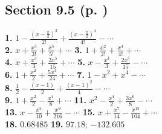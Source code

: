 \begin{multicols*}{2}
\subsection*{Section 9.5 (p. \pageref{sec9dot5})}
\textbf{1.} $1 - \frac{(x-\frac{\pi}{2})^2}{2!} + \frac{(x-\frac{\pi}{2})^4}{4!} - \cdots$\\
\textbf{2.} $x + \frac{x^3}{3!} + \frac{x^5}{5!} + \cdots$ \quad
\textbf{3.} $1 + \frac{x^2}{2!} + \frac{x^4}{4!} + \cdots$\\
\textbf{4.} $x + \frac{x^3}{3} + \frac{2x^5}{15} + \cdots$ \quad
\textbf{5.} $x - \frac{x^3}{3} + \frac{2x^5}{15} - \cdots$\\
\textbf{6.} $1 + \frac{x^2}{2} + \frac{5x^4}{24} + \cdots$ \quad
\textbf{7.} $1 - x^2 + x^4 - \cdots$\\
\textbf{8.} $\frac{1}{2} - \frac{(x-1)}{2} + \frac{(x-1)^2}{4} - \cdots$\\
\textbf{9.} $1 + \frac{x^2}{2} - \frac{x^4}{8} + \cdots$ \quad
\textbf{11.} $x^2 - \frac{x^4}{2} + \frac{3x^6}{8} - \cdots$\\
\textbf{13.} $x - \frac{x^5}{10} + \frac{x^9}{216} - \cdots$ \quad
\textbf{15.} $x + \frac{x^7}{14} - \frac{x^{13}}{104} + \cdots$\\
\textbf{18.} $0.68485$ \quad
\textbf{19.} $97.18$; $-132.605$
\end{multicols*}
